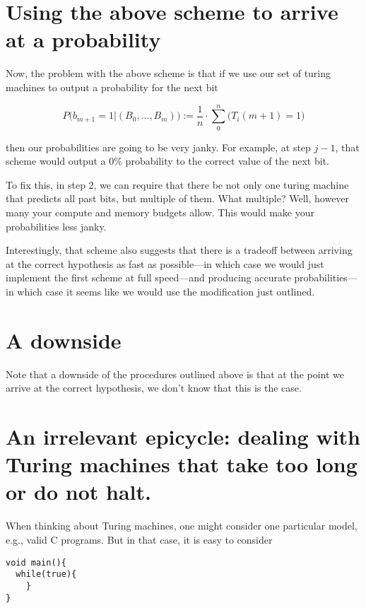 \documentclass[12pt,authoryear]{elsarticle}
\begin{document}
\section{Using the above scheme to arrive at a probability }

Now, the problem with the above scheme is that if we use our set of turing machines to output a probability for the next bit

$$ P\Big(b_{m + 1} = 1 | (B_0, ..., B_m) \Big) := \frac{1}{n} \cdot \sum_0^n \Big(T_i(m+1) = 1\Big) $$

then our probabilities are going to be very janky. For example, at step $ j - 1 $, that scheme would output a 0\% probability to the correct value of the next bit.

To fix this, in step 2, we can require that there be not only one turing machine that predicts all past bits, but multiple of them. What multiple? Well, however many your compute and memory budgets allow. This would make your probabilities less janky. 

Interestingly, that scheme also suggests that there is a tradeoff between arriving at the correct hypothesis as fast as possible—in which case we would just implement the first scheme at full speed—and producing accurate probabilities—in which case it seems like we would use the modification just outlined.

\section{A downside}

Note that a downside of the procedures outlined above is that at the point we arrive at the correct hypothesis, we don't know that this is the case.

\section{An irrelevant epicycle: dealing with Turing machines that take too long or do not halt.}

When thinking about Turing machines, one might consider one particular model, e.g., valid C programs. But in that case, it is easy to consider 

\begin{verbatim}
void main(){
  while(true){
	}
}
\end{verbatim}
\end{document}
